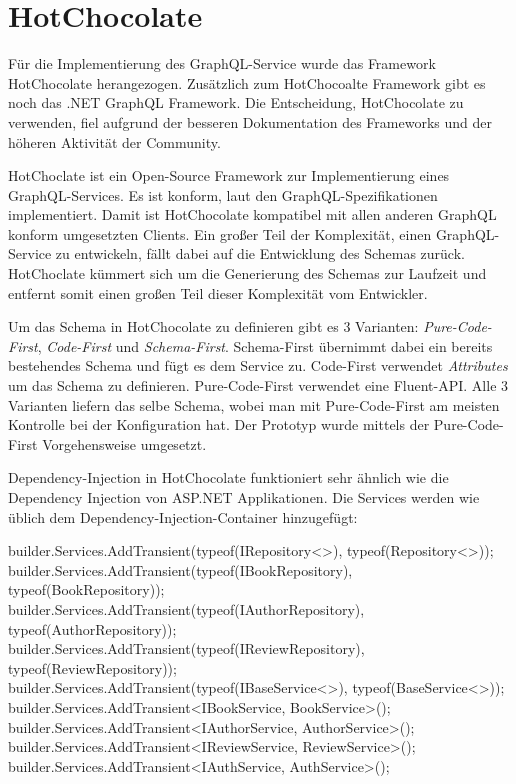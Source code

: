 \section{HotChocolate}
Für die Implementierung des GraphQL-Service wurde das Framework HotChocolate herangezogen.
Zusätzlich zum HotChocoalte Framework gibt es noch das .NET GraphQL Framework.
Die Entscheidung, HotChocolate zu verwenden, fiel aufgrund der besseren Dokumentation des Frameworks und der höheren Aktivität der Community.

HotChoclate ist ein Open-Source Framework zur Implementierung eines GraphQL-Services.
Es ist konform, laut den GraphQL-Spezifikationen implementiert.
Damit ist HotChocolate kompatibel mit allen anderen GraphQL konform umgesetzten Clients.
Ein großer Teil der Komplexität, einen GraphQL-Service zu entwickeln, fällt dabei auf die Entwicklung des Schemas zurück.
HotChoclate kümmert sich um die Generierung des Schemas zur Laufzeit und entfernt somit einen großen Teil dieser Komplexität vom Entwickler.

Um das Schema in HotChocolate zu definieren gibt es 3 Varianten: \textit{Pure-Code-First}, \textit{Code-First} und \textit{Schema-First}.
Schema-First übernimmt dabei ein bereits bestehendes Schema und fügt es dem Service zu.
Code-First verwendet \textit{Attributes} um das Schema zu definieren.
Pure-Code-First verwendet eine Fluent-API.
Alle 3 Varianten liefern das selbe Schema, wobei man mit Pure-Code-First am meisten Kontrolle bei der Konfiguration hat.
Der Prototyp wurde mittels der Pure-Code-First Vorgehensweise umgesetzt.

Dependency-Injection in HotChocolate funktioniert sehr ähnlich wie die Dependency Injection von ASP.NET Applikationen.
Die Services werden wie üblich dem Dependency-Injection-Container hinzugefügt:

\begin{JsCode}
builder.Services.AddTransient(typeof(IRepository<>), typeof(Repository<>));
builder.Services.AddTransient(typeof(IBookRepository), typeof(BookRepository));
builder.Services.AddTransient(typeof(IAuthorRepository), typeof(AuthorRepository));
builder.Services.AddTransient(typeof(IReviewRepository), typeof(ReviewRepository));
builder.Services.AddTransient(typeof(IBaseService<>), typeof(BaseService<>));
builder.Services.AddTransient<IBookService, BookService>();
builder.Services.AddTransient<IAuthorService, AuthorService>();
builder.Services.AddTransient<IReviewService, ReviewService>();
builder.Services.AddTransient<IAuthService, AuthService>();
\end{JsCode}


